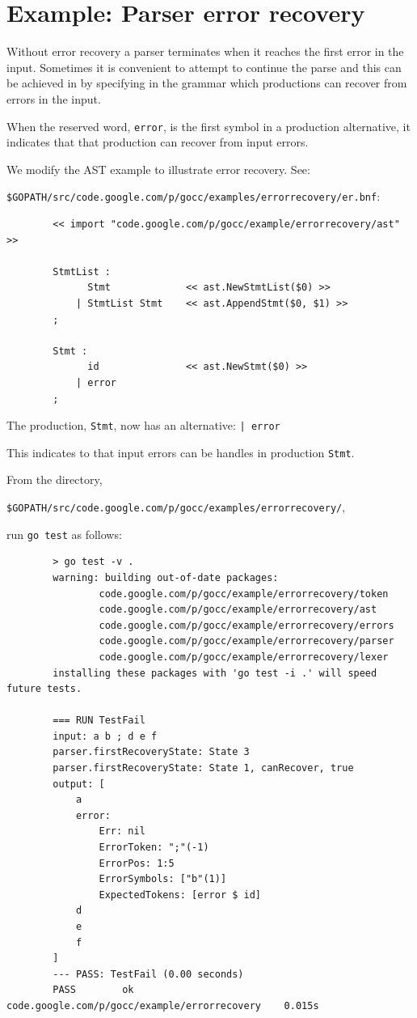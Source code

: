 \documentclass[12pt]{article}
\begin{document}
\section{Example: Parser error recovery} \label{sec:error recovery}
	Without error recovery a \gocc parser terminates when it reaches the first error in the input. Sometimes it is convenient to attempt to continue the parse and this can be achieved in \gocc by specifying in the grammar which productions can recover from errors in the input. 

	When the \gocc reserved word, \verb|error|, is the first symbol in a production alternative, it indicates that that production can recover from input errors.

	We modify the AST example to illustrate error recovery. See:

	\verb|$GOPATH/src/code.google.com/p/gocc/examples/errorrecovery/er.bnf|:

	\begin{verbatim}
		<< import "code.google.com/p/gocc/example/errorrecovery/ast" >>

		StmtList : 
		      Stmt             << ast.NewStmtList($0) >>
		    | StmtList Stmt    << ast.AppendStmt($0, $1) >>
		;

		Stmt : 
		      id               << ast.NewStmt($0) >>
		    | error
		;
	\end{verbatim}

	The production, \verb|Stmt|, now has an alternative: \verb"| error"

	This indicates to \gocc that input errors can be handles in production \verb|Stmt|.

	From the directory, 

	\verb|$GOPATH/src/code.google.com/p/gocc/examples/errorrecovery/|, 

	run \verb|go test| as follows:

	\begin{verbatim}
		> go test -v .
		warning: building out-of-date packages:
		        code.google.com/p/gocc/example/errorrecovery/token
		        code.google.com/p/gocc/example/errorrecovery/ast
		        code.google.com/p/gocc/example/errorrecovery/errors
		        code.google.com/p/gocc/example/errorrecovery/parser
		        code.google.com/p/gocc/example/errorrecovery/lexer
		installing these packages with 'go test -i .' will speed future tests.

		=== RUN TestFail
		input: a b ; d e f
		parser.firstRecoveryState: State 3
		parser.firstRecoveryState: State 1, canRecover, true
		output: [
		    a
		    error:
		        Err: nil
		        ErrorToken: ";"(-1)
		        ErrorPos: 1:5
		        ErrorSymbols: ["b"(1)]
		        ExpectedTokens: [error $ id]
		    d
		    e
		    f
		]
		--- PASS: TestFail (0.00 seconds)
		PASS		ok      code.google.com/p/gocc/example/errorrecovery	0.015s
	\end{verbatim}
\end{document}

